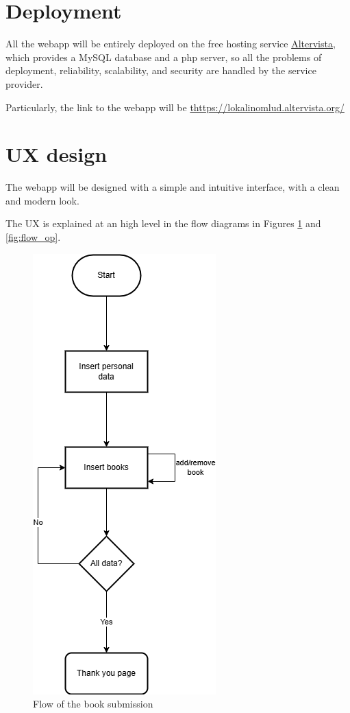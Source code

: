 

\section{Deployment}

All the webapp will be entirely deployed on the free hosting service \href{www.altervista.org}{Altervista}, which provides a MySQL database and a php server, so all the problems of deployment, reliability, scalability, and security are handled by the service provider.

Particularly, the link to the webapp will be \url{thttps://lokalinomlud.altervista.org/}

\section{UX design}

The webapp will be designed with a simple and intuitive interface, with a clean and modern look.

The UX is explained at an high level in the flow diagrams in Figures \ref{fig:flow_book_submission} and \ref{fig:flow_op}.

\begin{figure}[ht]
    \centering
    \includegraphics[width=.25\textwidth]{assets/flow_book_submission.png}
    \caption{Flow of the book submission}
    \label{fig:flow_book_submission}
\end{figure}

